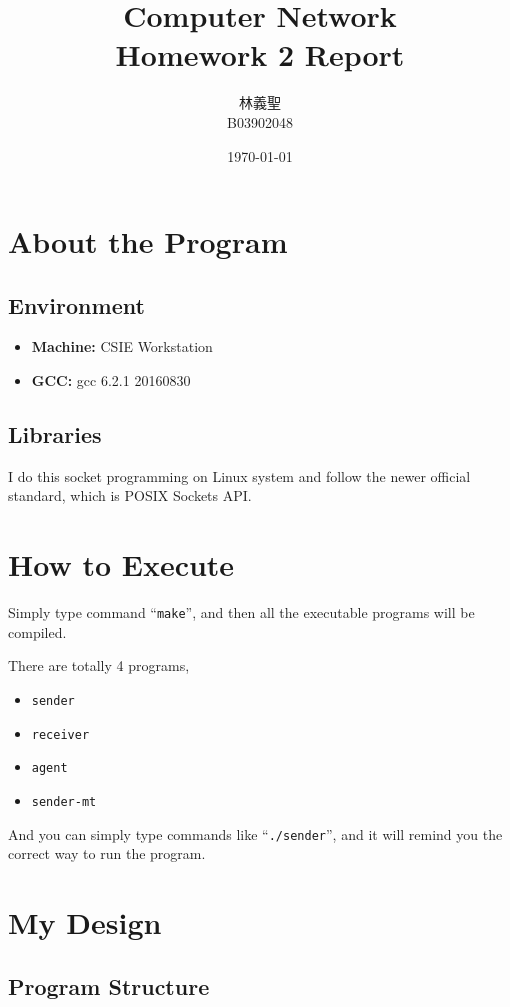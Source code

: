 \documentclass[12pt,a4paper]{extarticle}
\title{Computer Network\\ Homework 2 Report}
\author{林義聖\\B03902048}
\date{\today}
\begin{document}
\maketitle

\section{About the Program}

\subsection{Environment}

\begin{itemize}
	\item \textbf{Machine:} CSIE Workstation
	\item \textbf{GCC:} gcc 6.2.1 20160830
\end{itemize}

\subsection{Libraries}

I do this socket programming on Linux system and follow the newer official standard, which is POSIX Sockets API.

\section{How to Execute}

Simply type command ``\texttt{make}'', and then all the executable programs will be compiled.

There are totally 4 programs,
\begin{itemize}
	\item \texttt{sender}
	\item \texttt{receiver}
	\item \texttt{agent}
	\item \texttt{sender-mt}
\end{itemize}
And you can simply type commands like ``\texttt{./sender}'', and it will remind you the correct way to run the program.

\section{My Design}

\subsection{Program Structure}
\end{document}
